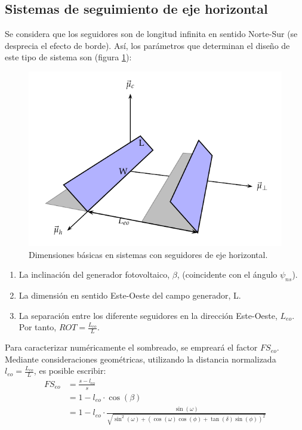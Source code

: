 \subsection{Sistemas de seguimiento de eje horizontal}
\label{sec:orgc8f349a}
Se considera que los seguidores son de longitud infinita en sentido Norte-Sur (se desprecia el efecto de borde). Así, los parámetros que determinan el diseño de este tipo de sistema son (figura \ref{fig:SeguidorEjeHorizontalSombras}):
\begin{figure}[htbp]
\centering
\includegraphics[scale=0.9]{figuras/SombrasHoriz.pdf}
\caption{Dimensiones básicas en sistemas con seguidores de eje horizontal. \label{fig:SeguidorEjeHorizontalSombras}}
\end{figure}
\begin{enumerate}
\item La inclinación del generador fotovoltaico, \(\beta\), (coincidente con el ángulo \(\psi_{ns}\)).
\item La dimensión en sentido Este-Oeste del campo generador, L.
\item La separación entre los diferente seguidores en la dirección Este-Oeste, \(L_{eo}\).
Por tanto, \(ROT=\frac{L_{eo}}{L}\).
\end{enumerate}

Para caracterizar numéricamente el sombreado, se empreará el factor \(FS_{eo}\). Mediante consideraciones geométricas, utilizando la distancia normalizada \(l_{eo}=\frac{L_{eo}}{L}\), es posible escribir:
\begin{align}
FS_{eo} & =\frac{s-l_{eo}}{s}\nonumber \\
 & =1-l_{eo}\cdot\cos(\beta)\nonumber \\
 &
 =1-l_{eo}\cdot\frac{\sin(\omega)}{\sqrt{\sin^{2}(\omega)+\left(\cos(\omega)\cos(\phi)+\tan(\delta)\sin(\phi)\right)^{2}}}\label{eq:FSeoHorizontal}
\end{align}

